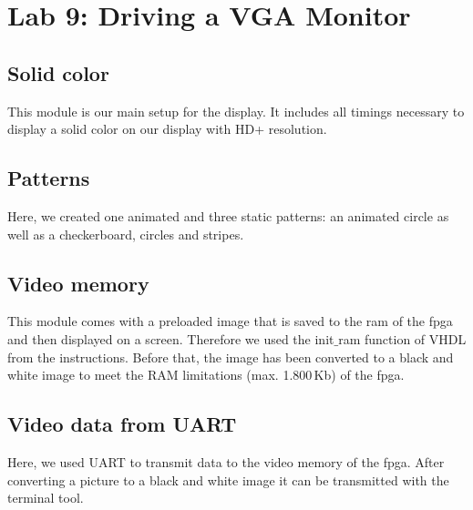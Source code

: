 \chapter{Lab 9: Driving a VGA Monitor}

\section{Solid color}

This module is our main setup for the display. It includes all timings necessary to display a solid color on our display with HD+ resolution.



\section{Patterns}

Here, we created one animated and three static patterns: an animated circle as well as a checkerboard, circles and stripes.









\section{Video memory}

This module comes with a preloaded image that is saved to the ram of the \gls{fpga} and then displayed on a screen. Therefore we used the init$\_$ram function of VHDL from the instructions. Before that, the image has been converted to a black and white image to meet the RAM limitations (max. 1.800\,Kb) of the \gls{fpga}.





\section{Video data from UART}

Here, we used UART to transmit data to the video memory of the \gls{fpga}. After converting a picture to a black and white image it can be transmitted with the terminal tool.

